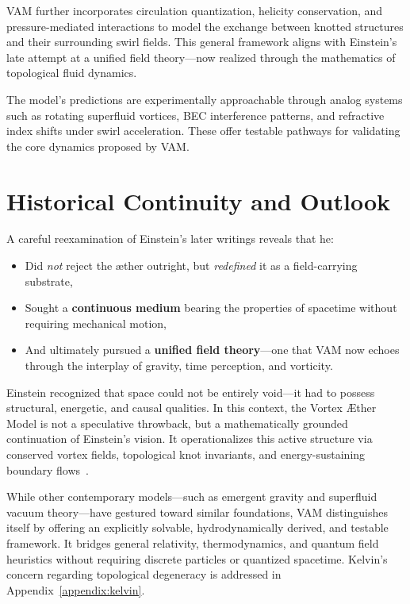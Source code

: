 \documentclass[preprint]{revtex4-2}
\begin{document}
VAM further incorporates circulation quantization, helicity conservation, and pressure-mediated interactions to model the exchange between knotted structures and their surrounding swirl fields. This general framework aligns with Einstein’s late attempt at a unified field theory—now realized through the mathematics of topological fluid dynamics.

The model's predictions are experimentally approachable through analog systems such as rotating superfluid vortices, BEC interference patterns, and refractive index shifts under swirl acceleration. These offer testable pathways for validating the core dynamics proposed by VAM.


  \section{Historical Continuity and Outlook}

A careful reexamination of Einstein's later writings reveals that he:
\begin{itemize}
    \item Did \emph{not} reject the æther outright, but \emph{redefined} it as a field-carrying substrate,
    \item Sought a \textbf{continuous medium} bearing the properties of spacetime without requiring mechanical motion,
    \item And ultimately pursued a \textbf{unified field theory}—one that VAM now echoes through the interplay of gravity, time perception, and vorticity.
\end{itemize}

Einstein recognized that space could not be entirely void—it had to possess structural, energetic, and causal qualities. In this context, the Vortex Æther Model is not a speculative throwback, but a mathematically grounded continuation of Einstein's vision. It operationalizes this active structure via conserved vortex fields, topological knot invariants, and energy-sustaining boundary flows~\cite{iskandarani2025vam1, iskandarani2025vam2}.

While other contemporary models—such as emergent gravity and superfluid vacuum theory—have gestured toward similar foundations, VAM distinguishes itself by offering an explicitly solvable, hydrodynamically derived, and testable framework. It bridges general relativity, thermodynamics, and quantum field heuristics without requiring discrete particles or quantized spacetime.
Kelvin's concern regarding topological degeneracy is addressed in Appendix~\ref{appendix:kelvin}.
\end{document}
